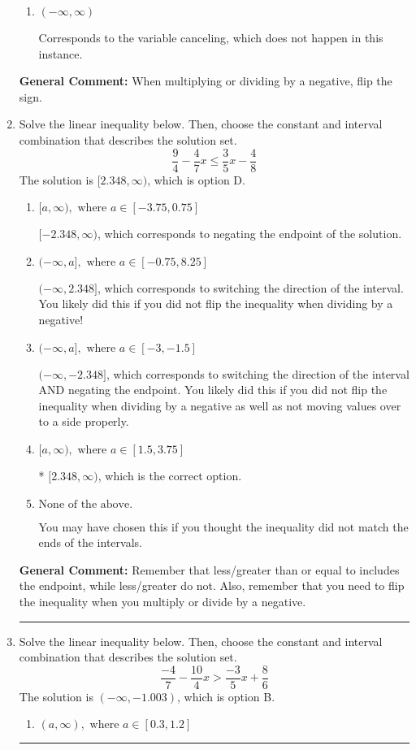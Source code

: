 \documentclass{extbook}[14pt]
\newcommand{\litem}[1]{\item #1

\rule{\textwidth}{0.4pt}}
\begin{document}
\begin{enumerate}
{\begin{enumerate}[label=\Alph*.]
Corresponds to including the endpoints (when they should be excluded).
\item \( (-\infty, \infty) \)

Corresponds to the variable canceling, which does not happen in this instance.
\end{enumerate}

\textbf{General Comment:} When multiplying or dividing by a negative, flip the sign.
}
\litem{
Solve the linear inequality below. Then, choose the constant and interval combination that describes the solution set.
\[ \frac{9}{4} - \frac{4}{7} x \leq \frac{3}{5} x - \frac{4}{8} \]The solution is \( [2.348, \infty) \), which is option D.\begin{enumerate}[label=\Alph*.]
\item \( [a, \infty), \text{ where } a \in [-3.75, 0.75] \)

 $[-2.348, \infty)$, which corresponds to negating the endpoint of the solution.
\item \( (-\infty, a], \text{ where } a \in [-0.75, 8.25] \)

 $(-\infty, 2.348]$, which corresponds to switching the direction of the interval. You likely did this if you did not flip the inequality when dividing by a negative!
\item \( (-\infty, a], \text{ where } a \in [-3, -1.5] \)

 $(-\infty, -2.348]$, which corresponds to switching the direction of the interval AND negating the endpoint. You likely did this if you did not flip the inequality when dividing by a negative as well as not moving values over to a side properly.
\item \( [a, \infty), \text{ where } a \in [1.5, 3.75] \)

* $[2.348, \infty)$, which is the correct option.
\item \( \text{None of the above}. \)

You may have chosen this if you thought the inequality did not match the ends of the intervals.
\end{enumerate}

\textbf{General Comment:} Remember that less/greater than or equal to includes the endpoint, while less/greater do not. Also, remember that you need to flip the inequality when you multiply or divide by a negative.
}
\litem{
Solve the linear inequality below. Then, choose the constant and interval combination that describes the solution set.
\[ \frac{-4}{7} - \frac{10}{4} x > \frac{-3}{5} x + \frac{8}{6} \]The solution is \( (-\infty, -1.003) \), which is option B.\begin{enumerate}[label=\Alph*.]
\item \( (a, \infty), \text{ where } a \in [0.3, 1.2] \)


\end{enumerate}}
\end{enumerate}
\end{document}
